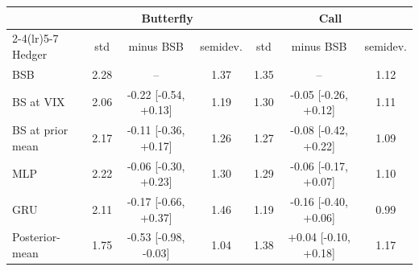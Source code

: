 \begin{tabular}{@{}lcccccc@{}}
\toprule
 & \multicolumn{3}{c}{Butterfly} & \multicolumn{3}{c}{Call} \\
\cmidrule(lr){2-4}\cmidrule(lr){5-7}
Hedger & std & minus BSB & semidev. & std & minus BSB & semidev. \\
\midrule
BSB & 2.28 & -- & 1.37 & 1.35 & -- & 1.12 \\
BS at VIX & 2.06 & -0.22 [-0.54, +0.13] & 1.19 & 1.30 & -0.05 [-0.26, +0.12] & 1.11 \\
BS at prior mean & 2.17 & -0.11 [-0.36, +0.17] & 1.26 & 1.27 & -0.08 [-0.42, +0.22] & 1.09 \\
MLP & 2.22 & -0.06 [-0.30, +0.23] & 1.30 & 1.29 & -0.06 [-0.17, +0.07] & 1.10 \\
GRU & 2.11 & -0.17 [-0.66, +0.37] & 1.46 & 1.19 & -0.16 [-0.40, +0.06] & 0.99 \\
Posterior-mean & 1.75 & -0.53 [-0.98, -0.03] & 1.04 & 1.38 & +0.04 [-0.10, +0.18] & 1.17 \\
\bottomrule
\end{tabular}
